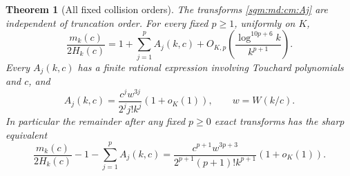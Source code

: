 \documentclass[11pt,letterpaper]{article}
\newtheorem{theorem}{Theorem}[section]
\theoremstyle{remark}\newtheorem{remark}[theorem]{Remark}
\theoremstyle{definition}\newtheorem{definition}[theorem]{Definition}
\begin{document}
\begin{theorem}[All fixed collision orders]\label{sgm:md:cm:main}
The transforms \eqref{sgm:md:cm:Aj} are independent of truncation order.
For every fixed \(p\ge1\), uniformly on \(K\),
\begin{equation}\label{sgm:md:cm:all-order}
 \frac{m_k(c)}{2H_k(c)}
 =1+\sum_{j=1}^{p}A_j(k,c)
   +O_{K,p}\left(\frac{\log^{10p+6}k}{k^{p+1}}\right).
\end{equation}
Every \(A_j(k,c)\) has a finite rational expression involving
Touchard polynomials and \(c\), and
\begin{equation}\label{sgm:md:cm:Aj-leading}
 A_j(k,c)=\frac{c^jw^{3j}}{2^jj!k^j}(1+o_K(1)),
 \qquad w=W(k/c).
\end{equation}
In particular the remainder after any fixed \(p\ge0\) exact
transforms has the sharp equivalent
\begin{equation}\label{sgm:md:cm:sharp-remainder}
 \frac{m_k(c)}{2H_k(c)}-1-\sum_{j=1}^{p}A_j(k,c)
 =\frac{c^{p+1}w^{3p+3}}
        {2^{p+1}(p+1)!k^{p+1}}(1+o_K(1)).
\end{equation}
\end{theorem}
\end{document}
